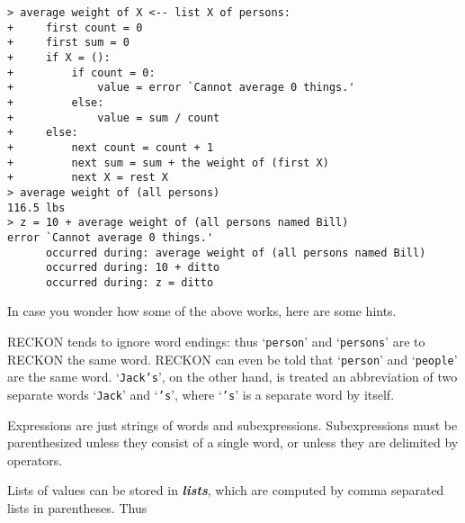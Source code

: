 \documentclass[12pt]{article}
\newcommand{\skey}[2]{{\bf \em #1#2}\index{#1}}
\newenvironment{indpar}[1][0.3in]%
	{\begin{list}{}%
		     {\setlength{\itemsep}{0in}%
		      \setlength{\topsep}{0in}%
		      \setlength{\parsep}{1ex}%
		      \setlength{\labelwidth}{#1}%
		      \setlength{\leftmargin}{#1}%
		      \addtolength{\leftmargin}{\labelsep}}%
	 \item}%
	{\end{list}}
\begin{document}
\begin{indpar}
\verb|> average weight of X <-- list X of persons:| \\
\verb|+     first count = 0| \\
\verb|+     first sum = 0| \\
\verb|+     if X = ():| \\
\verb|+         if count = 0:| \\
\verb|+             value = error `Cannot average 0 things.'| \\
\verb|+         else:| \\
\verb|+             value = sum / count| \\
\verb|+     else:| \\
\verb|+         next count = count + 1| \\
\verb|+         next sum = sum + the weight of (first X)| \\
\verb|+         next X = rest X| \\
\verb|> average weight of (all persons)| \\
\verb|116.5 lbs| \\
\verb|> z = 10 + average weight of (all persons named Bill)| \\
\verb|error `Cannot average 0 things.'| \\
\verb|      occurred during: average weight of (all persons named Bill)| \\
\verb|      occurred during: 10 + ditto| \\
\verb|      occurred during: z = ditto|
\end{indpar}

In case you wonder how some of the above works, here are some hints.

RECKON tends to ignore word endings: thus `{\tt person}' and
`{\tt persons}' are to RECKON the same word.
RECKON can even be told that `{\tt person}'
and `{\tt people}' are the same word.
`{\tt Jack's}', on the other hand, is treated an abbreviation
of two separate words `{\tt Jack}' and `{\tt 's}', where `{\tt 's}' is
a separate word by itself.

Expressions are just strings of words and subexpressions.  Subexpressions
must be parenthesized unless they consist of a single word, or unless
they are delimited by operators.

Lists of values can be stored in \skey{list}s, which are computed by comma
separated lists in parentheses.  Thus
\end{document}
